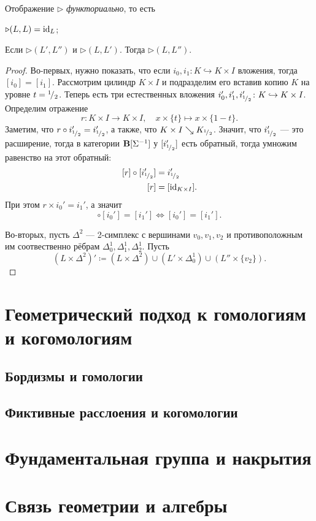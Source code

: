\documentclass[10pt, twoside]{article}
\begin{document}
\begin{lemma}
    Отображение $\triangleright$ \emph{функториально}, то есть 
    \begin{conditions}
        \item $\triangleright(L, L) = \operatorname{id}_L$;
        \item Если $\triangleright(L', L'')$ и $\triangleright(L, L')$. Тогда $\triangleright(L, L'')$.
    \end{conditions}
\end{lemma}
\begin{proof}
    Во-первых, нужно показать, что если $i_0, i_1 \colon K \hookrightarrow K \times I$ вложения, тогда $[i_0] = [i_1]$. Рассмотрим цилиндр $K \times I$ и подразделим его вставив копию $K$ на уровне $t = {}^{1}\!/_{2}$. Теперь есть три естественных вложения $i_0', i_1', i_{{}^{1}\!/_{2}}' \colon K \hookrightarrow K \times I$. Определим отражение $$r \colon K \times I \to K \times I, \quad x \times \{t\} \mapsto x \times \{1-t\}.$$ 
    Заметим, что $r \circ i_{{}^{1}\!/_{2}}' = i_{{}^{1}\!/_{2} }'$, а также, что $K \times I \searrow K_{{}^{1}\!/_{2}}$. Значит, что $i_{{}^{1}\!/_{2}}'$ --- это расширение, тогда в категории $\mathbf{B}[\Sigma^{-1}]$ у $[i_{{}^{1}\!/_{2}}']$ есть обратный, тогда умножим равенство на этот обратный:
    \begin{equation}
        \begin{aligned}
            [r] \circ [i_{\rfrac 1 2}'] &= i_{\rfrac 1 2}' \\
            [r] &= [\id_{K\times I}].
        \end{aligned}
    \end{equation}
    При этом $r \times i_0' = i_1'$, а значит 
    \begin{equation}
        [r] \circ [i_0'] = [i_1'] \Longleftrightarrow [i_0'] = [i_1'].
    \end{equation}
    
    Во-вторых, пусть $\Delta^2$ --- 2-симплекс с вершинами $v_0, v_1, v_2$ и противоположным им соотвественно рёбрам $\Delta_0^1, \Delta_1^1, \Delta_2^1.$ Пусть $$(L \times \Delta^2)' \coloneq (L \times \Delta^2) \cup (L' \times \Delta_0^1) \cup (L'' \times \{v_2\}). $$

\end{proof}

\section{Геометрический подход к гомологиям и когомологиям}
\subsection{Бордизмы и гомологии}
\subsection{Фиктивные расслоения и когомологии}

\section{Фундаментальная группа и накрытия}

\section{Связь геометрии и алгебры}
\end{document}
